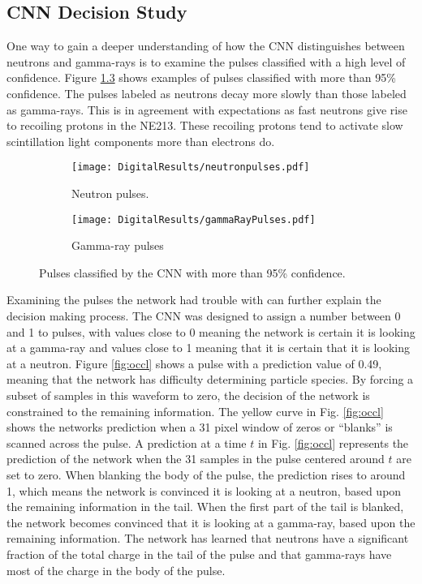 \documentclass[main.tex]{subfiles}
\begin{document}
\begin{appendices}
\chapter{CNN Decision Study}
One way to gain a deeper understanding of how the CNN distinguishes between neutrons and gamma-rays is to examine the pulses classified with a high level of confidence. Figure \ref{fig:CNN95} shows examples of pulses classified with more than 95\% confidence. The pulses labeled as neutrons decay more slowly than those labeled as gamma-rays. This is in agreement with expectations as fast neutrons give rise to recoiling protons in the NE213. These recoiling protons tend to activate slow scintillation light components more than electrons do. 

\begin{figure}[h!]
\centering
\begin{subfigure}{.5\textwidth}
  \centering
  \texttt{[image: DigitalResults/neutronpulses.pdf]}
  \caption{Neutron pulses.}
  \label{fig:CNNneutron}
\end{subfigure}%
\begin{subfigure}{.5\textwidth}
  \centering
  \texttt{[image: DigitalResults/gammaRayPulses.pdf]}
  \caption{Gamma-ray pulses}
  \label{fig:CNNgamma}
\end{subfigure}
\caption{Pulses classified by the CNN with more than 95\% confidence.}
\label{fig:CNN95}
\end{figure}

Examining the pulses the network had trouble with can further explain the decision making process. The CNN was designed to assign a number between 0 and 1 to pulses, with values close to 0 meaning the network is certain it is looking at a gamma-ray and values close to 1 meaning that it is certain that it is looking at a neutron. 
Figure \ref{fig:occl} shows a pulse with a prediction value of 0.49, meaning that the network has difficulty determining particle species. By forcing a subset of samples in this waveform to zero, the decision of the network is constrained to the remaining information. The yellow curve in Fig. \ref{fig:occl} shows the networks prediction when a 31 pixel window of zeros or ``blanks'' is scanned across the pulse. A prediction at a time $t$ in Fig. \ref{fig:occl} represents the prediction of the network when the 31 samples in the pulse centered around $t$ are set to zero. When blanking the body of the pulse, the prediction rises to around 1, which means the network is convinced it is looking at a neutron, based upon the remaining information in the tail. When the first part of the tail is blanked, the network becomes convinced that it is looking at a gamma-ray, based upon the remaining information. The network has learned that neutrons have a significant fraction of the total charge in the tail of the pulse and that gamma-rays have most of the charge in the body of the pulse.




\end{appendices}
\end{document}
